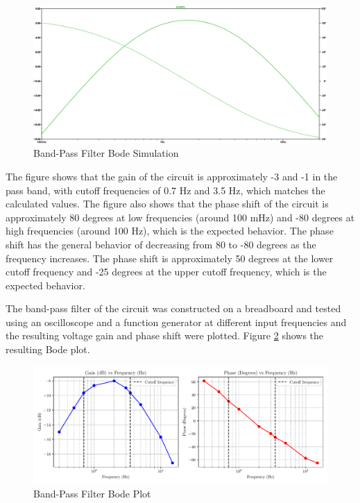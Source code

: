\documentclass[CMPE]{KGCOEReport}
\begin{document}
\begin{figure}[H]
    \centering
    \includegraphics[width=1\textwidth]{SimFreqBandPass.png}
    \caption{Band-Pass Filter Bode Simulation}
    \label{fig:bandPassSim}
\end{figure}

The figure shows that the gain of the circuit is approximately -3 and -1 in the pass band, with cutoff frequencies of 0.7 Hz and 3.5 Hz, which matches the calculated values. The figure also shows that the phase shift of the circuit is approximately 80 degrees at low frequencies (around 100 mHz) and -80 degrees at high frequencies (around 100 Hz), which is the expected behavior. The phase shift has the general behavior of decreasing from 80 to -80 degrees as the frequency increases. The phase shift is approximately 50 degrees at the lower cutoff frequency and -25 degrees at the upper cutoff frequency, which is the expected behavior.

The band-pass filter of the circuit was constructed on a breadboard and tested using an oscilloscope and a function generator at different input frequencies and the resulting voltage gain and phase shift were plotted. Figure \ref{fig:bandPassBode} shows the resulting Bode plot.

\begin{figure}[H]
    \centering
    \includegraphics[width=1\textwidth]{band_pass_plot.pdf}
    \caption{Band-Pass Filter Bode Plot}
    \label{fig:bandPassBode}
\end{figure}
\end{document}
